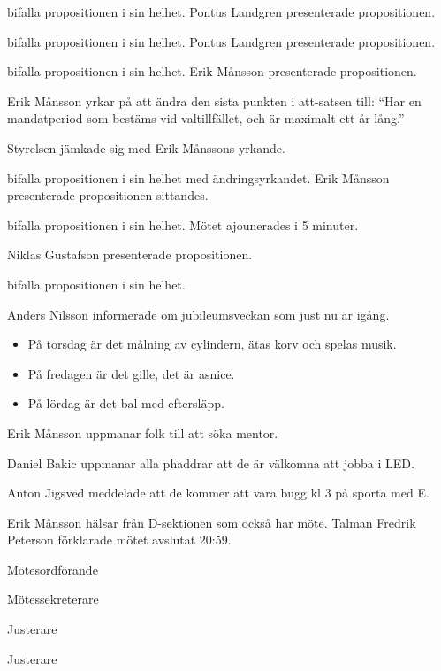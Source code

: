 \documentclass[10pt]{article}
\def\mo{Fredrik Peterson}
\def\ms{Johan Karlberg}
\def\ji{David Uhler Brand}
\def\jii{Malin Lindström}
\begin{document}
\begin{paragrafer}
\begin{paragrafer}
            \Mba bifalla propositionen i sin helhet.
            Pontus Landgren presenterade propositionen.

            \Mba bifalla propositionen i sin helhet.
            Pontus Landgren presenterade propositionen.

            \Mba bifalla propositionen i sin helhet.
            Erik Månsson presenterade propositionen.

            Erik Månsson yrkar på att ändra den sista punkten i att-satsen till:
            ``Har en mandatperiod som bestäms vid valtillfället, och är maximalt ett år lång.''

            Styrelsen jämkade sig med Erik Månssons yrkande.

            \Mba bifalla propositionen i sin helhet med ändringsyrkandet.
            Erik Månsson presenterade propositionen sittandes.

            \Mba bifalla propositionen i sin helhet.
            Mötet ajounerades i 5 minuter.

            Niklas Gustafson presenterade propositionen.

            \Mba bifalla propositionen i sin helhet.
        \end{paragrafer}

Anders Nilsson informerade om jubileumsveckan som just nu är igång.
\begin{itemize}
  \item På torsdag är det målning av cylindern, ätas korv och spelas musik.
  \item På fredagen är det gille, det är asnice.
  \item På lördag är det bal med eftersläpp.
\end{itemize}

Erik Månsson uppmanar folk till att söka mentor.

Daniel Bakic uppmanar alla phaddrar att de är välkomna att jobba i LED.

Anton Jigsved meddelade att de kommer att vara bugg kl 3 på sporta med E.

Erik Månsson hälsar från D-sektionen som också har möte.
Talman {\mo} förklarade mötet avslutat 20:59.

\end{paragrafer}

\hidesignfoot
\begin{signatures}{4}
\signature{\mo}{Mötesordförande}
\signature{\ms}{Mötessekreterare}
\signature{\ji}{Justerare}
\signature{\jii}{Justerare}
\end{signatures}
\end{document}
